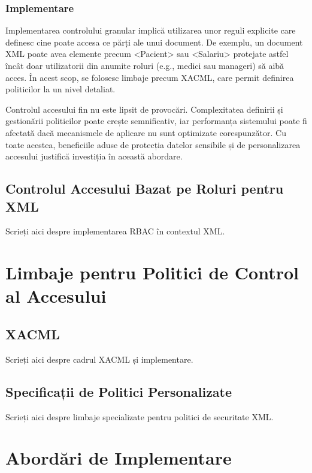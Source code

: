 \documentclass[runningheads]{llncs}
\begin{document}
\begin{spacing}{1.5}
\begin{itemize}
\end{itemize}

\subsubsection{Implementare}

Implementarea controlului granular implică utilizarea unor reguli explicite care definesc cine poate accesa ce părți ale unui document. De exemplu, un document XML poate avea elemente precum <Pacient> sau <Salariu> protejate astfel încât doar utilizatorii din anumite roluri (e.g., medici sau manageri) să aibă acces. În acest scop, se folosesc limbaje precum XACML, care permit definirea politicilor la un nivel detaliat.

Controlul accesului fin nu este lipsit de provocări. Complexitatea definirii și gestionării politicilor poate crește semnificativ, iar performanța sistemului poate fi afectată dacă mecanismele de aplicare nu sunt optimizate corespunzător. Cu toate acestea, beneficiile aduse de protecția datelor sensibile și de personalizarea accesului justifică investiția în această abordare.



\subsection{Controlul Accesului Bazat pe Roluri pentru XML}

Scrieți aici despre implementarea RBAC în contextul XML.



\section{Limbaje pentru Politici de Control al Accesului}

\subsection{XACML}
Scrieți aici despre cadrul XACML și implementare.

\subsection{Specificații de Politici Personalizate}
Scrieți aici despre limbaje specializate pentru politici de securitate XML.

\section{Abordări de Implementare}


\end{spacing}
\end{document}
